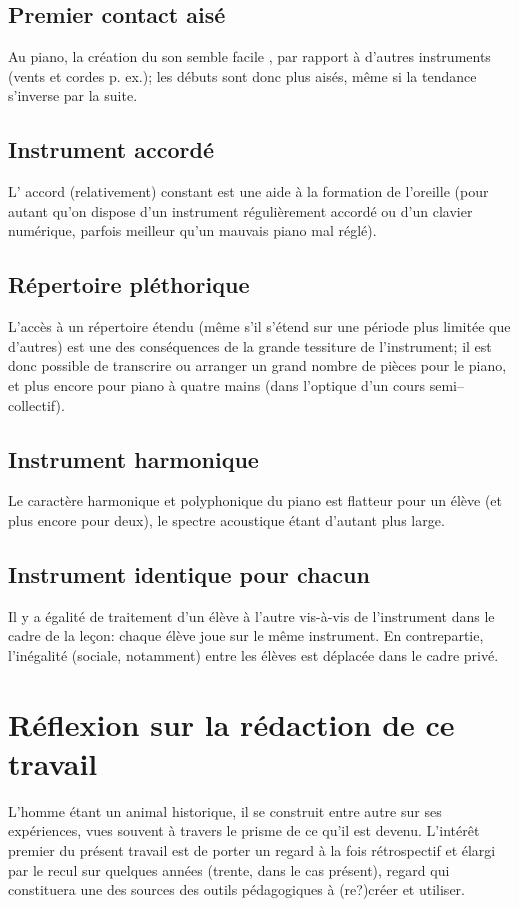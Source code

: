 \subsection*{Premier contact aisé}
Au piano, la création du son semble \og{} facile \fg{}, par rapport à d'autres instruments (vents et cordes p. ex.); les débuts sont donc plus aisés, même si la tendance s'inverse par la suite.

\subsection*{Instrument \og{} accordé\fg{}}
L' accord (relativement) constant est une aide à la formation de l'oreille (pour autant qu'on dispose d'un instrument régulièrement accordé ou d'un clavier numérique, parfois meilleur qu'un mauvais piano mal réglé).

\subsection*{Répertoire pléthorique}
L'accès à un répertoire étendu (même s'il s'étend sur une période plus limitée que d'autres) est une des conséquences de la grande tessiture de l'instrument; il est donc possible de transcrire ou arranger un grand nombre de pièces pour le piano, et plus encore pour piano à quatre mains (dans l'optique d'un cours semi--collectif).
\subsection*{Instrument harmonique}

Le caractère harmonique et polyphonique du piano est flatteur pour un élève (et plus encore pour deux), le spectre acoustique étant d'autant plus large.

\subsection*{Instrument identique pour chacun}
Il y a égalité de traitement d'un élève à l'autre vis-à-vis de l'instrument dans le cadre de la leçon: chaque élève joue sur le même instrument. En contrepartie, l'inégalité (sociale, notamment) entre les élèves est déplacée dans le cadre privé.

\section*{Réflexion sur la rédaction de ce travail}

L'homme étant un animal historique, il se construit entre autre sur ses expériences, vues souvent à travers le prisme de ce qu'il est devenu. L'intérêt premier du présent travail est de porter un regard à la fois rétrospectif et élargi par le recul sur quelques années (trente, dans le cas présent), regard qui constituera une des sources des outils pédagogiques à (re?)créer et utiliser.

